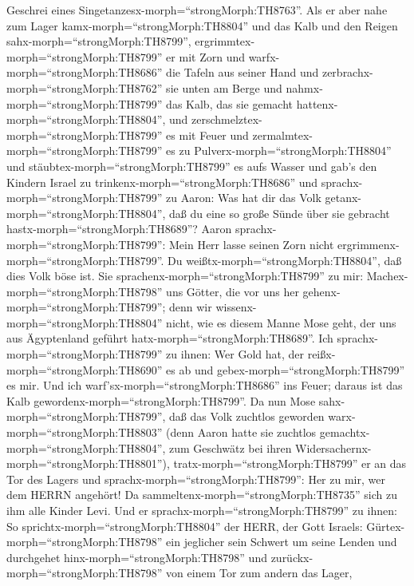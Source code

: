 Geschrei eines Singetanzesx-morph=``strongMorph:TH8763''. 
Als er aber nahe zum Lager kamx-morph=``strongMorph:TH8804'' und das
Kalb und den Reigen sahx-morph=``strongMorph:TH8799'',
ergrimmtex-morph=``strongMorph:TH8799'' er mit Zorn und
warfx-morph=``strongMorph:TH8686'' die Tafeln aus seiner Hand und
zerbrachx-morph=``strongMorph:TH8762'' sie unten am Berge 
und nahmx-morph=``strongMorph:TH8799'' das Kalb, das sie gemacht
hattenx-morph=``strongMorph:TH8804'', und
zerschmelztex-morph=``strongMorph:TH8799'' es mit Feuer und
zermalmtex-morph=``strongMorph:TH8799'' es zu
Pulverx-morph=``strongMorph:TH8804'' und
stäubtex-morph=``strongMorph:TH8799'' es aufs Wasser und gab's den
Kindern Israel zu trinkenx-morph=``strongMorph:TH8686'' 
und sprachx-morph=``strongMorph:TH8799'' zu Aaron: Was hat dir das Volk
getanx-morph=``strongMorph:TH8804'', daß du eine so große Sünde über sie
gebracht hastx-morph=``strongMorph:TH8689''?  Aaron
sprachx-morph=``strongMorph:TH8799'': Mein Herr lasse seinen Zorn nicht
ergrimmenx-morph=``strongMorph:TH8799''. Du
weißtx-morph=``strongMorph:TH8804'', daß dies Volk böse ist.
 Sie sprachenx-morph=``strongMorph:TH8799'' zu mir:
Machex-morph=``strongMorph:TH8798'' uns Götter, die vor uns her
gehenx-morph=``strongMorph:TH8799''; denn wir
wissenx-morph=``strongMorph:TH8804'' nicht, wie es diesem Manne Mose
geht, der uns aus Ägyptenland geführt hatx-morph=``strongMorph:TH8689''.
 Ich sprachx-morph=``strongMorph:TH8799'' zu ihnen: Wer
Gold hat, der reißx-morph=``strongMorph:TH8690'' es ab und
gebex-morph=``strongMorph:TH8799'' es mir. Und ich
warf'sx-morph=``strongMorph:TH8686'' ins Feuer; daraus ist das Kalb
gewordenx-morph=``strongMorph:TH8799''.  Da nun Mose
sahx-morph=``strongMorph:TH8799'', daß das Volk zuchtlos geworden
warx-morph=``strongMorph:TH8803'' (denn Aaron hatte sie zuchtlos
gemachtx-morph=``strongMorph:TH8804'', zum Geschwätz bei ihren
Widersachernx-morph=``strongMorph:TH8801''), 
tratx-morph=``strongMorph:TH8799'' er an das Tor des Lagers und
sprachx-morph=``strongMorph:TH8799'': Her zu mir, wer dem HERRN
angehört! Da sammeltenx-morph=``strongMorph:TH8735'' sich zu ihm alle
Kinder Levi.  Und er sprachx-morph=``strongMorph:TH8799''
zu ihnen: So sprichtx-morph=``strongMorph:TH8804'' der HERR, der Gott
Israels: Gürtex-morph=``strongMorph:TH8798'' ein jeglicher sein Schwert
um seine Lenden und durchgehet hinx-morph=``strongMorph:TH8798'' und
zurückx-morph=``strongMorph:TH8798'' von einem Tor zum andern das Lager,
